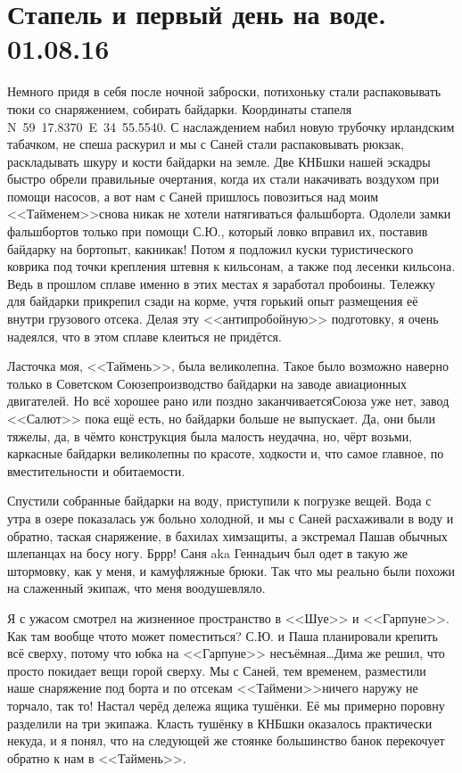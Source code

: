 \chapter{Стапель и первый день на воде. 01.08.16} 

Немного придя в себя после ночной заброски, потихоньку стали распаковывать тюки со снаряжением, собирать байдарки. Координаты стапеля N~59\degree~17.8370\textprime~E~34\degree~55.5540\textprime. С наслаждением  набил новую трубочку ирландским табачком, не спеша раскурил и мы с Саней стали распаковывать рюкзак, раскладывать шкуру и кости байдарки на земле. Две КНБ\sdash шки нашей эскадры быстро обрели правильные очертания, когда их стали накачивать воздухом при помощи насосов, а вот нам с Саней пришлось повозиться над моим <<Тайменем>>\mdash снова никак не хотели натягиваться фальшборта. Одолели замки фальшбортов только при помощи С.Ю., который ловко вправил их, поставив байдарку на борт\mdash опыт, как\sdash никак! Потом я подложил куски туристического коврика под точки крепления штевня к кильсонам, а также под лесенки кильсона. Ведь в прошлом сплаве именно в этих местах я заработал пробоины. Тележку для байдарки прикрепил сзади на корме, учтя горький опыт размещения её внутри грузового отсека. Делая эту <<антипробойную>> подготовку, я очень надеялся, что в этом сплаве клеиться не придётся. 

Ласточка моя, <<Таймень>>, была великолепна. Такое было возможно наверно только в Советском Союзе\mdash производство байдарки на заводе авиационных двигателей. Но всё хорошее рано или поздно заканчивается\mdash Союза уже нет, завод <<Салют>> пока ещё есть, но байдарки больше не выпускает. Да, они были тяжелы, да, в чём\sdash то конструкция была малость неудачна, но, чёрт возьми, каркасные байдарки великолепны по красоте, ходкости и, что самое главное, по вместительности и обитаемости.

Спустили собранные байдарки на воду, приступили к погрузке вещей. Вода с утра в озере показалась уж больно холодной, и мы с Саней расхаживали в воду и обратно, таская снаряжение, в бахилах химзащиты, а экстремал Паша\mdash в обычных шлепанцах на босу ногу. Бр\sdash р\sdash р! Саня aka Геннадьич был одет в такую же штормовку, как у меня, и камуфляжные брюки. Так что мы реально были похожи на слаженный экипаж, что меня воодушевляло. 

Я с ужасом смотрел на жизненное пространство в <<Шуе>> и <<Гарпуне>>. Как там вообще что\sdash то может поместиться? С.Ю. и Паша планировали крепить всё сверху, потому что юбка на <<Гарпуне>> несъёмная\ldots Дима же решил, что просто покидает вещи горой сверху. Мы с Саней, тем временем, разместили наше снаряжение под борта и по отсекам <<Таймени>>\mdash ничего наружу не торчало, так то! Настал черёд дележа ящика тушёнки. Её мы примерно поровну разделили на три экипажа. Класть тушёнку в КНБ\sdash шки оказалось практически некуда, и я понял, что на следующей же стоянке большинство банок перекочует обратно к  нам в <<Таймень>>.

